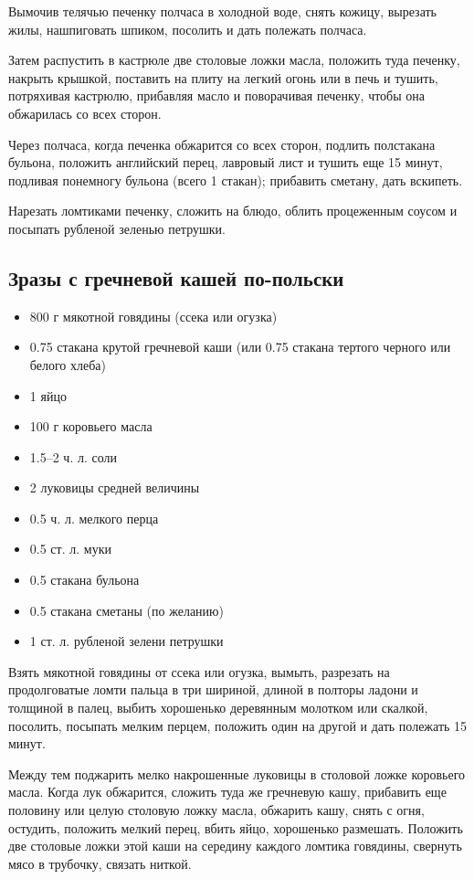 Вымочив телячью печенку полчаса в холодной воде, снять кожицу, вырезать жилы, нашпиговать шпиком, посолить и дать полежать полчаса.

Затем распустить в кастрюле две столовые ложки масла, положить туда печенку, накрыть крышкой, поставить на плиту на легкий огонь или в печь и тушить, потряхивая кастрюлю, прибавляя масло и поворачивая печенку, чтобы она обжарилась со всех сторон.

Через полчаса, когда печенка обжарится со всех сторон, подлить полстакана бульона, положить английский перец, лавровый лист и тушить еще 15 минут, подливая понемногу бульона (всего 1 стакан); прибавить сметану, дать вскипеть.

Нарезать ломтиками печенку, сложить на блюдо, облить процеженным соусом и посыпать рубленой зеленью петрушки.

\subsection{Зразы с гречневой кашей по-польски}

\begin{itemize}
	\item 800 г мякотной говядины (ссека или огузка) 
    \item 0.75 стакана крутой гречневой каши (или 0.75 стакана тертого черного или белого хлеба) 
    \item 1 яйцо 
    \item 100 г коровьего масла 
    \item 1.5–2 ч. л. соли
    \item 2 луковицы средней величины
    \item 0.5 ч. л. мелкого перца
    \item 0.5 ст. л. муки 
    \item 0.5 стакана бульона
    \item 0.5 стакана сметаны (по желанию)
    \item 1 ст. л. рубленой зелени петрушки
\end{itemize}

Взять мякотной говядины от ссека или огузка, вымыть, разрезать на продолговатые ломти пальца в три шириной, длиной в полторы ладони и толщиной в палец, выбить хорошенько деревянным молотком или скалкой, посолить, посыпать мелким перцем, положить один на другой и дать полежать 15 минут.

Между тем поджарить мелко накрошенные луковицы в столовой ложке коровьего масла. Когда лук обжарится, сложить туда же гречневую кашу, прибавить еще половину или целую столовую ложку масла, обжарить кашу, снять с огня, остудить, положить мелкий перец, вбить яйцо, хорошенько размешать. Положить две столовые ложки этой каши на середину каждого ломтика говядины, свернуть мясо в трубочку, связать ниткой.

